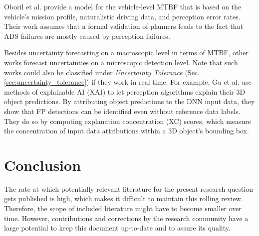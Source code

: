 \documentclass[conference]{IEEEtran}
\begin{document}
Oboril et al. \cite{Oboril2022mtbf_ieee} provide a model for the vehicle-level MTBF that is based on the vehicle's mission profile, naturalistic driving data, and perception error rates. 
Their work assumes that a formal validation of planners leads to the fact that ADS failures are mostly caused by perception failures.


Besides uncertainty forecasting on a macroscopic level in terms of MTBF, other works forecast uncertainties on a microscopic detection level. 
Note that such works could also be classified under \textit{Uncertainty Tolerance} (Sec. \ref{sec:uncertainty_tolerance}) if they work in real time.
For example, Gu et al. \cite{Gu2022explanations} use methods of explainable AI (XAI) to let perception algorithms explain their 3D object predictions. 
By attributing object predictions to the DNN input data, they show that FP detections can be identified even without reference data labels. 
They do so by computing explanation concentration (XC) scores, which measure the concentration of input data attributions within a 3D object's bounding box. 

\section{Conclusion}
\label{sec:conclusion}

The rate at which potentially relevant literature for the present research question gets published is high, which makes it difficult to maintain this rolling review. 
Therefore, the scope of included literature might have to become smaller over time. 
However, contributions and corrections by the research community have a large potential to keep this document up-to-date and to assure its quality.
 



{\small


}
\end{document}
